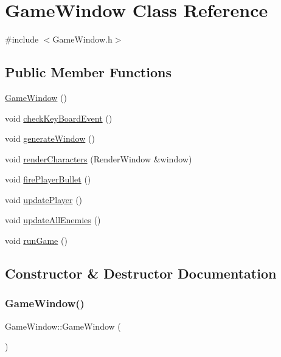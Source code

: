 \hypertarget{class_game_window}{}\section{Game\+Window Class Reference}
\label{class_game_window}


{\ttfamily \#include $<$Game\+Window.\+h$>$}

\subsection*{Public Member Functions}
\begin{DoxyCompactItemize}
\item 
\hyperlink{class_game_window_a81f2f6fea59b4723569c591756328163}{Game\+Window} ()
\item 
void \hyperlink{class_game_window_a6d969bf2a5284c731c5ba3eb03d4e3a1}{check\+Key\+Board\+Event} ()
\item 
void \hyperlink{class_game_window_a43f64127a3b8836405f80242c1e997f4}{generate\+Window} ()
\item 
void \hyperlink{class_game_window_ac32c7b2e85e30f5bab516551c6277c3a}{render\+Characters} (Render\+Window \&window)
\item 
void \hyperlink{class_game_window_a119f405a2ff052c74d902c5b02bf0f05}{fire\+Player\+Bullet} ()
\item 
void \hyperlink{class_game_window_a9ebcf385e9ed9fd52f1d8b2c88f9c091}{update\+Player} ()
\item 
void \hyperlink{class_game_window_a62ed57d80a4eb7945777f5d383747bdf}{update\+All\+Enemies} ()
\item 
void \hyperlink{class_game_window_aa4188b605313be96d69cf32d3f143987}{run\+Game} ()
\end{DoxyCompactItemize}


\subsection{Constructor \& Destructor Documentation}
\mbox{\label{class_game_window_a81f2f6fea59b4723569c591756328163}} 
\subsubsection{\texorpdfstring{Game\+Window()}{GameWindow()}}
{\footnotesize\ttfamily Game\+Window\+::\+Game\+Window (\begin{DoxyParamCaption}{ }\end{DoxyParamCaption})}



